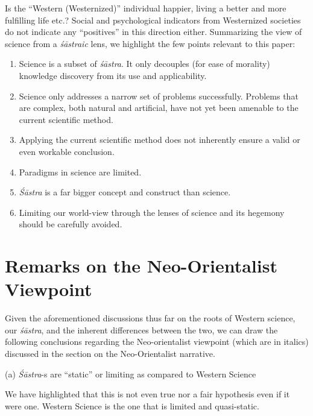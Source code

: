 Is the “Western (Westernized)” individual happier, living a better and more fulfilling life etc.? Social and psychological indicators from Westernized societies do not indicate any “positives” in this direction either. Summarizing the view of science from a \textit{śāstraic} lens, we highlight the few points relevant to this paper:
\begin{enumerate}[topsep=1pt]
\itemsep=1pt
\item Science is a subset of \textit{śāstra}. It only decouples (for ease of morality) knowledge discovery from its use and applicability.

 \item Science only addresses a narrow set of problems successfully. Problems that are complex, both natural and artificial, have not yet been amenable to the current scientific method.

 \item Applying the current scientific method does not inherently ensure a valid or even workable conclusion.

 \item Paradigms in science are limited.

 \item \textit{Śāstra} is a far bigger concept and construct than science.

 \item Limiting our world-view through the lenses of science and its hegemony should be carefully avoided.
\end{enumerate}

\newpage

\section*{Remarks on the Neo-Orientalist Viewpoint}

Given the aforementioned discussions thus far on the roots of Western science, our \textit{śāstra}, and the inherent differences between the two, we can draw the following conclusions regarding the Neo-orientalist viewpoint (which are in italics) discussed in the section on the Neo-Orientalist narrative.

(a) \textit{Śāstra}-s are “static” or limiting as compared to Western Science

We have highlighted that this is not even true nor a fair hypothesis even if it were one. Western Science is the one that is limited and quasi-static.

